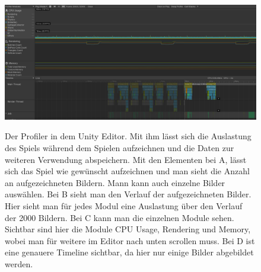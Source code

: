 \begin{figure}[H]
\centering
\begin{annotatedFigure}
	{\includegraphics[scale=0.428]{Bilder/Profiler.png}}
\end{annotatedFigure}
\caption{Der Profiler in dem Unity Editor. Mit ihm lässt sich die Auslastung des Spiels während dem Spielen aufzeichnen und die Daten zur weiteren Verwendung abspeichern. Mit den Elementen bei A, lässt sich das Spiel wie gewünscht aufzeichnen und man sieht die Anzahl an aufgezeichneten Bildern. Mann kann auch einzelne Bilder auswählen. Bei B sieht man den Verlauf der aufgezeichneten Bilder. Hier sieht man für jedes Modul eine Auslastung über den Verlauf der 2000 Bildern. Bei C kann man die einzelnen Module sehen. Sichtbar sind hier die Module CPU Usage, Rendering und Memory, wobei man für weitere im Editor nach unten scrollen muss. Bei D ist eine genauere Timeline sichtbar, da hier nur einige Bilder abgebildet werden.}
\label{fig:profiler}
\end{figure}